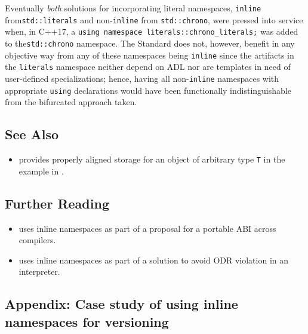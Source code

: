 Eventually \emph{both} solutions for incorporating literal namespaces,
\lstinline!inline! from\linebreak[4] \lstinline!std::literals! and non-\lstinline!inline! from
\lstinline!std::chrono!, were pressed into service when, in C++17, a
\mbox{\lstinline!using!~\lstinline!namespace!~\lstinline!literals::chrono_literals;!}
was added to the\linebreak[4]
 \lstinline!std::chrono! namespace. The Standard does not, however, benefit in any objective way from any of
these namespaces being \lstinline!inline! since the artifacts in the
\lstinline!literals! namespace neither depend on ADL nor are templates in
need of user-defined specializations; hence, having all
non-\lstinline!inline! namespaces with appropriate \lstinline!using!
declarations would have been functionally indistinguishable from the
bifurcated approach taken.

\subsection[See Also]{See Also}\label{see-also}

\begin{itemize}
\item{%
provides properly aligned storage for an object of arbitrary type \lstinline!T! in the example in  .}
\end{itemize}

\subsection[Further Reading]{Further Reading}\label{further-reading}

\begin{itemize}
\item{\cite{sutter14b} uses inline namespaces as part of a proposal for a portable ABI across compilers.}
\item{\cite{lopez-gomez20} uses inline namespaces as part of a solution to avoid ODR violation in an interpreter.}
\end{itemize}

\subsection[Appendix: Case study of using \lstinline!inline! namespaces for versioning]{Appendix: Case study of using {\SubsecCode inline} namespaces for versioning}\label{appendix:-case-study-of-using-inline-namespaces-for-versioning}

